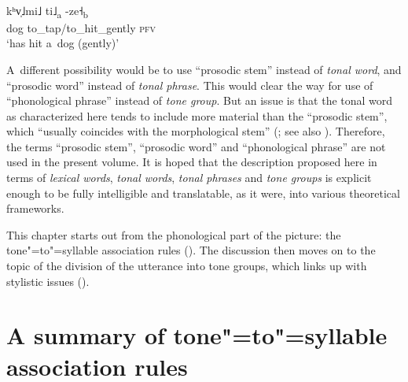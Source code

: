 \begin{exe}
	\ex
	\label{ex:hitdogPFV}
	\\
	\gll kʰv̩˩mi˩		ti˩\textsubscript{a}		-ze˧\textsubscript{b}\\
	dog		to\_tap/to\_hit\_gently			\textsc{pfv}\\
	\glt ‘has hit a~dog (gently)'
\end{exe}

A~different possibility would be to use “prosodic stem” instead of \textit{tonal word}, and “prosodic word” instead of \textit{tonal phrase}. This would clear the way for use of “phonological phrase” instead of \textit{tone group}. But an issue is that the tonal word as characterized here tends to include more material than the ``prosodic stem'', which ``usually coincides with the morphological stem'' (\citealt[17]{vandevelde2008b}; see also \citealt{downing2015}). Therefore, the terms “prosodic stem”, “prosodic word” and “phonological phrase” are not used in the present volume. It is hoped that the description proposed here in terms of \textit{lexical words}, \textit{tonal words}, \textit{tonal phrases} and \textit{tone groups} is explicit enough to be fully intelligible and translatable, as it were, into various theoretical frameworks.

This chapter starts out from the phonological part of the picture: the tone"=to"=syllable association rules (). The discussion then moves on to the topic of the division of the utterance into tone groups, which links up with stylistic issues ().

\section{A summary of tone"=to"=syllable association rules}
\label{sec:asummaryoftonetosyllableassociationrules}


